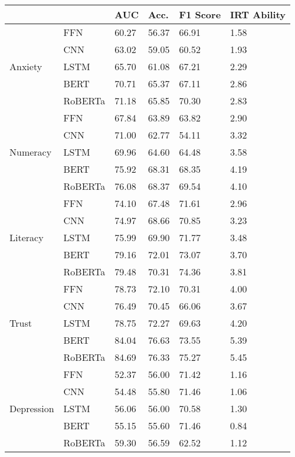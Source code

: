 \begin{tabular}{llllll}
\toprule
 &  & AUC & Acc. & F1 Score & IRT Ability \\
\midrule
\multirow[t]{5}{*}{Anxiety} & FFN & 60.27 & 56.37 & 66.91 & 1.58 \\
 & CNN & 63.02 & 59.05 & 60.52 & 1.93 \\
 & LSTM & 65.70 & 61.08 & 67.21 & 2.29 \\
 & BERT & 70.71 & 65.37 & 67.11 & 2.86 \\
 & RoBERTa & 71.18 & 65.85 & 70.30 & 2.83 \\
\cline{1-6}
\multirow[t]{5}{*}{Numeracy} & FFN & 67.84 & 63.89 & 63.82 & 2.90 \\
 & CNN & 71.00 & 62.77 & 54.11 & 3.32 \\
 & LSTM & 69.96 & 64.60 & 64.48 & 3.58 \\
 & BERT & 75.92 & 68.31 & 68.35 & 4.19 \\
 & RoBERTa & 76.08 & 68.37 & 69.54 & 4.10 \\
\cline{1-6}
\multirow[t]{5}{*}{Literacy} & FFN & 74.10 & 67.48 & 71.61 & 2.96 \\
 & CNN & 74.97 & 68.66 & 70.85 & 3.23 \\
 & LSTM & 75.99 & 69.90 & 71.77 & 3.48 \\
 & BERT & 79.16 & 72.01 & 73.07 & 3.70 \\
 & RoBERTa & 79.48 & 70.31 & 74.36 & 3.81 \\
\cline{1-6}
\multirow[t]{5}{*}{Trust} & FFN & 78.73 & 72.10 & 70.31 & 4.00 \\
 & CNN & 76.49 & 70.45 & 66.06 & 3.67 \\
 & LSTM & 78.75 & 72.27 & 69.63 & 4.20 \\
 & BERT & 84.04 & 76.63 & 73.55 & 5.39 \\
 & RoBERTa & 84.69 & 76.33 & 75.27 & 5.45 \\
\cline{1-6}
\multirow[t]{5}{*}{Depression} & FFN & 52.37 & 56.00 & 71.42 & 1.16 \\
 & CNN & 54.48 & 55.80 & 71.46 & 1.06 \\
 & LSTM & 56.06 & 56.00 & 70.58 & 1.30 \\
 & BERT & 55.15 & 55.60 & 71.46 & 0.84 \\
 & RoBERTa & 59.30 & 56.59 & 62.52 & 1.12 \\
\cline{1-6}
\bottomrule
\end{tabular}
